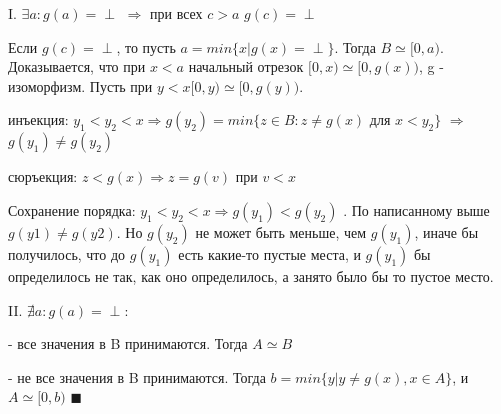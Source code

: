 I. $\exists a: g(a) = \perp$ $\Rightarrow$ при всех $c > a$ $g(c) = \perp$

Если $g(c) = \perp$, то пусть $a = min\{x| g(x) = \perp\}$. Тогда $B \simeq [0, a)$. Доказывается, что при $x < a$ начальный отрезок $[0, x) \simeq [0, g(x))$, g - изоморфизм. Пусть при  $y < x [0, y) \simeq [0, g(y))$.

	инъекция: $y_1 < y_2 < x \Rightarrow g(y_2) = min\{z \in B: z \neq g(x)$ для $x<y_2\}$ $\Rightarrow$ $g(y_1) \neq g(y_2)$
	
	
	сюръекция: $z < g(x) \Rightarrow z = g(v)$ при $v < x$
	

Сохранение порядка: $y_1 < y_2 < x \Rightarrow g(y_1) < g(y_2)$ . По написанному выше $g(y1) \neq g(y2)$. Но $g(y_2)$ не может быть меньше, чем $g(y_1)$, иначе бы получилось, что до $g(y_1)$ есть какие-то пустые места, и $g(y_1)$ бы определилось не так, как оно определилось, а занято было бы то пустое место.

II. $\nexists a: g(a) = \perp$: 

- все значения в B принимаются. Тогда $A \simeq B$

- не все значения в B принимаются. Тогда $b = min\{y | y \neq g(x), x \in A\}$, и $A \simeq [0, b)$
$\blacksquare$